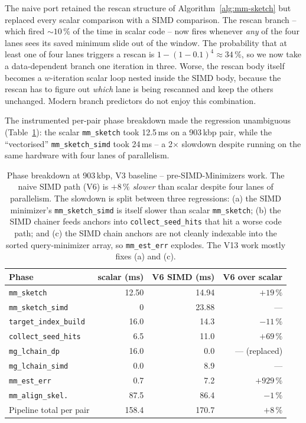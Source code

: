 The naive port retained the rescan structure of
Algorithm~\ref{alg:mm-sketch} but replaced every scalar comparison
with a SIMD comparison.  The rescan branch -- which fired
$\sim 10\,\%$ of the time in scalar code -- now fires whenever
\emph{any} of the four lanes sees its saved minimum slide out of
the window.  The probability that at least one of four lanes
triggers a rescan is $1 - (1 - 0.1)^4 \approx 34\,\%$, so we now
take a data-dependent branch one iteration in three.  Worse, the
rescan body itself becomes a $w$-iteration scalar loop nested
inside the SIMD body, because the rescan has to figure out
\emph{which} lane is being rescanned and keep the others
unchanged.  Modern branch predictors do not enjoy this combination.

The instrumented per-pair phase breakdown made the regression
unambiguous (Table~\ref{tab:v6-phase}): the scalar
\texttt{mm\_sketch} took 12.5\,ms on a 903\,kbp pair, while the
``vectorised'' \texttt{mm\_sketch\_simd} took 24\,ms -- a 2$\times$
slowdown despite running on the same hardware with four lanes of
parallelism.

\begin{table}[ht]
  \centering
  \begin{tabular}{lrrr}
    \toprule
    Phase & scalar (ms) & V6 SIMD (ms) & V6 over scalar \\
    \midrule
    \texttt{mm\_sketch}      & 12.50 & 14.94 & $+19\,\%$ \\
    \texttt{mm\_sketch\_simd} & 0    & 23.88 & --- \\
    \texttt{target\_index\_build} & 16.0 & 14.3 & $-11\,\%$ \\
    \texttt{collect\_seed\_hits} & 6.5  & 11.0 & $+69\,\%$ \\
    \texttt{mg\_lchain\_dp}   & 16.0 & 0.0  & --- (replaced) \\
    \texttt{mg\_lchain\_simd} & 0.0  & 8.9  & --- \\
    \texttt{mm\_est\_err}     & 0.7  & 7.2  & $+929\,\%$ \\
    \texttt{mm\_align\_skel.}  & 87.5 & 86.4 & $-1\,\%$ \\
    \midrule
    Pipeline total per pair & 158.4 & 170.7 & $+8\,\%$ \\
    \bottomrule
  \end{tabular}
  \caption{Phase breakdown at 903\,kbp, V3 baseline -- pre-SIMD-Minimizers
    work. The naive SIMD path (V6) is $+8\,\%$ \emph{slower} than
    scalar despite four lanes of parallelism. The slowdown is split
    between three regressions: (a) the SIMD minimizer's
    \texttt{mm\_sketch\_simd} is itself slower than scalar
    \texttt{mm\_sketch}; (b) the SIMD chainer feeds anchors into
    \texttt{collect\_seed\_hits} that hit a worse code path; and
    (c) the SIMD chain anchors are not cleanly indexable into the
    sorted query-minimizer array, so \texttt{mm\_est\_err} explodes.
    The V13 work mostly fixes (a) and (c).}
  \label{tab:v6-phase}
\end{table}

